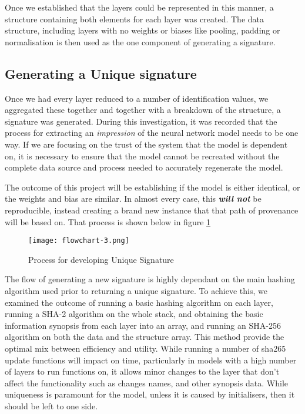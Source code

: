 Once we established that the layers could be represented in this manner, a structure containing both elements for each layer was created. The data structure, including layers with no weights or biases like pooling, padding or normalisation is then used as the one component of generating a signature.

\subsection{Generating a Unique signature}
Once we had every layer reduced to a number of identification values, we aggregated these together and together with a breakdown of the structure, a signature was generated. During this investigation, it was recorded that the process for extracting an \textit{impression} of the neural network model needs to be one way. If we are focusing on the trust of the system that the model is dependent on, it is necessary to ensure that the model cannot be recreated without the complete data source and process needed to accurately regenerate the model.

The outcome of this project will be establishing if the model is either identical, or the weights and bias are similar. In almost every case, this \textit{\textbf{will not}} be reproducible, instead creating a brand new instance that that path of provenance will be based on. That process is shown below in figure \ref{fig_sig_generator}

\begin{figure}[!ht]
    \centering
    \texttt{[image: flowchart-3.png]}
    \caption{Process for developing Unique Signature}
    \label{fig_sig_generator}
\end{figure}

The flow of generating a new signature is highly dependant on the main hashing algorithm used prior to returning a unique signature. To achieve this, we examined the outcome of running a basic hashing algorithm on each layer, running a SHA-2\cite{technologySecureHashStandard2015} algorithm on the whole stack, and obtaining the basic information synopsis from each layer into an array, and running an SHA-256 algorithm on both the data and the structure array. This method provide the optimal mix between efficiency and utility. While running a number of sha265 update functions will impact on time, particularly in models with a high number of layers to run functions on, it allows minor changes to the layer that don't affect the functionality such as changes names, and other synopsis data. While uniqueness is paramount for the model, unless it is caused by initialisers, then it should be left to one side.

